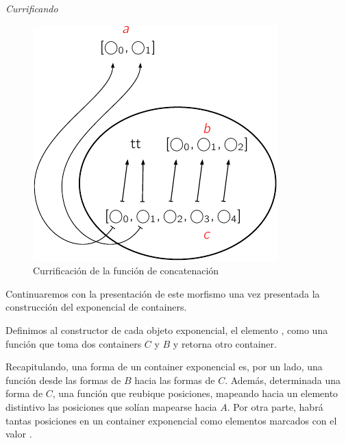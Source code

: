 \begin{example} {\it Currificando}
\begin{figure}[H] 
\begin{minipage}{0.3\textwidth}
\begin{center}
  \xymatrixrowsep{5pc} 
  \centerline{}
\end{center}
\vspace{13ex}
\end{minipage}
\begin{minipage}{0.7\textwidth}
  \includegraphics{img/curryappend1.pdf}
\end{minipage}
\caption{Currificación de la función de concatenación}
\label{fig:curryappend}
\end{figure}

Continuaremos con la presentación de este morfismo una vez presentada la construcción del exponencial de containers.
\end{example}


\begin{definition}\label{def:cont:exp}
Definimos al constructor de cada objeto exponencial, el elemento \AgdaFunction{$\_\hat{\ \ }\_$}, como una función que toma dos containers $C$ y $B$ y retorna otro container. 

\end{definition}

Recapitulando, una forma de un container exponencial es, por un lado, una función desde las formas de $B$ hacia las formas de $C$. Además, determinada una forma de $C$, una función que reubique posiciones, mapeando hacia un elemento distintivo  las posiciones que solían mapearse hacia $A$. Por otra parte, habrá tantas posiciones en un container exponencial como elementos marcados con el valor  .

